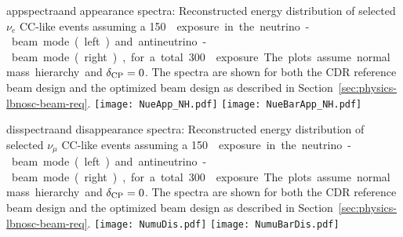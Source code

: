 \begin{cdrfigure}{appspectra}{\nue and \anue appearance spectra: Reconstructed energy distribution of selected $\nu_e$ CC-like events assuming a \SI{150}~\ktMWyr{} exposure in the neutrino-beam mode (left) and antineutrino-beam mode (right), for a total \SI{300}~\ktMWyr{} exposure.  The plots assume normal mass hierarchy and $\mdeltacp = 0$.  The spectra are shown for both the CDR reference beam design and the optimized beam design as described in Section~\ref{sec:physics-lbnosc-beam-req}.}
 \texttt{[image: NueApp\_NH.pdf]}
 \texttt{[image: NueBarApp\_NH.pdf]}
\end{cdrfigure}

\begin{cdrfigure}{disspectra}{\numu and \anumu disappearance spectra: Reconstructed energy distribution of selected $\nu_{\mu}$ CC-like events assuming a \SI{150}~\ktMWyr{} exposure in the neutrino-beam mode (left) and antineutrino-beam mode (right), for a total \SI{300}~\ktMWyr{} exposure.  The plots assume normal mass hierarchy and $\mdeltacp = 0$.  The spectra are shown for both the CDR reference beam design and the optimized beam design as described in Section~\ref{sec:physics-lbnosc-beam-req}.}
 \texttt{[image: NumuDis.pdf]}
 \texttt{[image: NumuBarDis.pdf]}
\end{cdrfigure}

